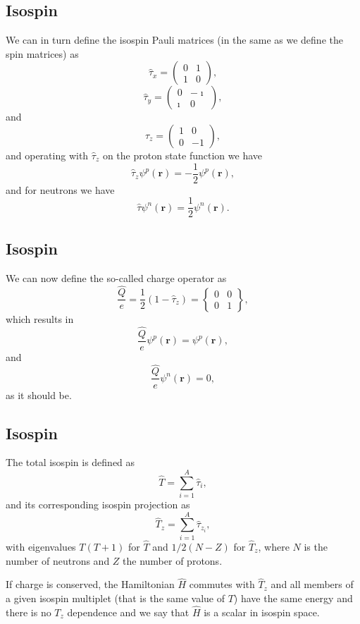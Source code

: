 \documentclass[%
twoside,                 %
final,                   %
10pt]{article}
\begin{document}
\subsection{Isospin}
\begin{block}{}
We can in turn define the isospin Pauli matrices (in the same as we define the spin matrices) as
\[
\hat{\tau}_x =\left(\begin{array}{cc} 0 & 1 \\ 1 & 0 \end{array}\right),
\]
\[
\hat{\tau}_y =\left(\begin{array}{cc} 0 & -\imath \\ \imath & 0 \end{array}\right),
\]
and
\[
\hat{\tau}_z =\left(\begin{array}{cc} 1 & 0 \\ 0 & -1 \end{array}\right),
\]
and operating with $\hat{\tau}_z$ on the proton state function we have
\[
\hat{\tau}_z\psi^p(\mathbf{r})=-\frac{1}{2}\psi^p(\mathbf{r}),
\]
and for neutrons we have
\[
\hat{\tau}\psi^n(\mathbf{r})=\frac{1}{2}\psi^n(\mathbf{r}).
\]
\end{block}

\subsection{Isospin}
\begin{block}{}
We can now define the so-called charge operator as 
\[
\frac{\hat{Q}}{e} = \frac{1}{2}\left(1-\hat{\tau}_z\right)=\begin{Bmatrix} 0 & 0 \\ 0 & 1 \end{Bmatrix},
\]
which results in 
\[
\frac{\hat{Q}}{e}\psi^p(\mathbf{r})=\psi^p(\mathbf{r}),
\]
and
\[
\frac{\hat{Q}}{e}\psi^n(\mathbf{r})=0,
\]
as it should be. 
\end{block}

\subsection{Isospin}
\begin{block}{}
The total isospin is defined as
\[
\hat{T}=\sum_{i=1}^A\hat{\tau}_i,
\]
and its corresponding isospin projection as
\[
\hat{T}_z=\sum_{i=1}^A\hat{\tau}_{z_i},
\]
with eigenvalues $T(T+1)$ for $\hat{T}$ and $1/2(N-Z)$ for $\hat{T}_z$, where $N$ is the number of neutrons and $Z$ the number of protons. 

If charge is conserved, the Hamiltonian $\hat{H}$ commutes with $\hat{T}_z$ and all members of a given isospin multiplet
(that is the same value of $T$) have the same energy and there is no $T_z$ dependence and we say that $\hat{H}$ is a scalar in isospin space.
\end{block}
\end{document}
